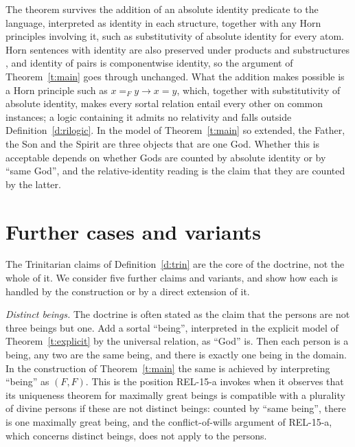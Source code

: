 \documentclass{situationist-preprint}
\begin{document}
\begin{remark}\label{r:abs}
The theorem survives the addition of an absolute identity predicate to the language, interpreted as identity in each structure, together with any Horn principles involving it, such as substitutivity of absolute identity for every atom. Horn sentences with identity are also preserved under products and substructures \citep{Horn1951}, and identity of pairs is componentwise identity, so the argument of Theorem~\ref{t:main} goes through unchanged. What the addition makes possible is a Horn principle such as $x =_F y \to x = y$, which, together with substitutivity of absolute identity, makes every sortal relation entail every other on common instances; a logic containing it admits no relativity and falls outside Definition~\ref{d:rilogic}. In the model of Theorem~\ref{t:main} so extended, the Father, the Son and the Spirit are three objects that are one God. Whether this is acceptable depends on whether Gods are counted by absolute identity or by \enquote{same God}, and the relative-identity reading is the claim that they are counted by the latter.
\end{remark}

\section{Further cases and variants}\label{s:cases}

The Trinitarian claims of Definition~\ref{d:trin} are the core of the doctrine, not the whole of it. We consider five further claims and variants, and show how each is handled by the construction or by a direct extension of it.

\emph{Distinct beings.} The doctrine is often stated as the claim that the persons are not three beings but one. Add a sortal \enquote{being}, interpreted in the explicit model of Theorem~\ref{t:explicit} by the universal relation, as \enquote{God} is. Then each person is a being, any two are the same being, and there is exactly one being in the domain. In the construction of Theorem~\ref{t:main} the same is achieved by interpreting \enquote{being} as $(F, F)$. This is the position REL-15-a invokes when it observes that its uniqueness theorem for maximally great beings is compatible with a plurality of divine persons if these are not distinct beings: counted by \enquote{same being}, there is one maximally great being, and the conflict-of-wills argument of REL-15-a, which concerns distinct beings, does not apply to the persons.
\end{document}
